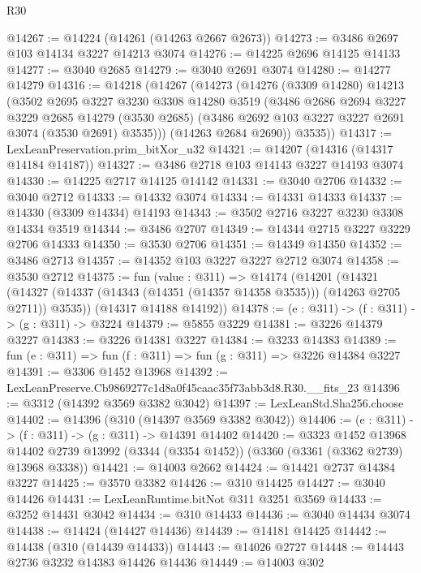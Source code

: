 \begin{lexlean}{R30}
\begin{coremodule}
@14267 := @14224 (@14261 (@14263 @2667 @2673))
@14273 := @3486 @2697 @103 @14134 @3227 @14213 @3074
@14276 := @14225 @2696 @14125 @14133
@14277 := @3040 @2685
@14279 := @3040 @2691 @3074
@14280 := @14277 @14279
@14316 := @14218
    (@14267
      (@14273
        (@14276
          (@3309 @14280)
          @14213
          (@3502
            @2695
            @3227
            @3230
            @3308
            @14280
            @3519
            (@3486
              @2686
              @2694
              @3227
              @3229
              @2685
              @14279
              (@3530 @2685)
              (@3486 @2692 @103 @3227 @3227 @2691 @3074 (@3530 @2691) @3535)))
          (@14263 @2684 @2690))
        @3535))
@14317 := LexLeanPreservation.prim_bitXor_u32
@14321 := @14207 (@14316 (@14317 @14184 @14187))
@14327 := @3486 @2718 @103 @14143 @3227 @14193 @3074
@14330 := @14225 @2717 @14125 @14142
@14331 := @3040 @2706
@14332 := @3040 @2712
@14333 := @14332 @3074
@14334 := @14331 @14333
@14337 := @14330 (@3309 @14334) @14193
@14343 := @3502 @2716 @3227 @3230 @3308 @14334 @3519
@14344 := @3486 @2707
@14349 := @14344 @2715 @3227 @3229 @2706 @14333
@14350 := @3530 @2706
@14351 := @14349 @14350
@14352 := @3486 @2713
@14357 := @14352 @103 @3227 @3227 @2712 @3074
@14358 := @3530 @2712
@14375 := fun (value : @311) =>
  @14174
    (@14201
      (@14321 (@14327 (@14337 (@14343 (@14351 (@14357 @14358 @3535))) (@14263 @2705 @2711)) @3535))
      (@14317 @14188 @14192))
@14378 := (e : @311) -> (f : @311) -> (g : @311) -> @3224
@14379 := @5855 @3229
@14381 := @3226 @14379 @3227
@14383 := @3226 @14381 @3227
@14384 := @3233 @14383
@14389 := fun (e : @311) => fun (f : @311) => fun (g : @311) => @3226 @14384 @3227
@14391 := @3306 @1452 @13968
@14392 := LexLeanPreserve.Cb9869277c1d8a0f45caac35f73abb3d8.R30.__fits_23
@14396 := @3312 (@14392 @3569 @3382 @3042)
@14397 := LexLeanStd.Sha256.choose
@14402 := @14396 (@310 (@14397 @3569 @3382 @3042))
@14406 := (e : @311) -> (f : @311) -> (g : @311) -> @14391 @14402
@14420 := @3323
    @1452
    @13968
    @14402
    @2739
    @13992
    (@3344 (@3354 @1452))
    (@3360 (@3361 (@3362 @2739) @13968 @3338))
@14421 := @14003 @2662
@14424 := @14421 @2737 @14384 @3227
@14425 := @3570 @3382
@14426 := @310 @14425
@14427 := @3040 @14426
@14431 := LexLeanRuntime.bitNot @311 @3251 @3569
@14433 := @3252 @14431 @3042
@14434 := @310 @14433
@14436 := @3040 @14434 @3074
@14438 := @14424 (@14427 @14436)
@14439 := @14181 @14425
@14442 := @14438 (@310 (@14439 @14433))
@14443 := @14026 @2727
@14448 := @14443 @2736 @3232 @14383 @14426 @14436
@14449 := @14003 @302

\end{coremodule}
\end{lexlean}
